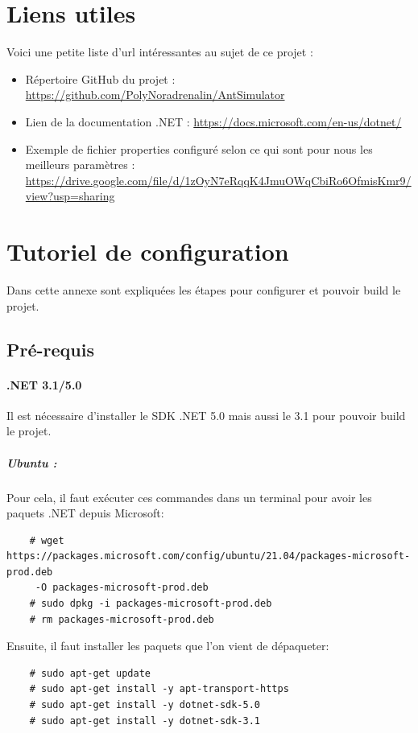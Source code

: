 \documentclass{EPUProjetDi}
\begin{document}
\chapter{Liens utiles}
Voici une petite liste d'url intéressantes au sujet de ce projet :

\begin{itemize}
\item {Répertoire GitHub du projet : \url{https://github.com/PolyNoradrenalin/AntSimulator} }
\item {Lien de la documentation .NET : \url{https://docs.microsoft.com/en-us/dotnet/}}
\item {Exemple de fichier properties configuré selon ce qui sont pour nous les meilleurs paramètres : 
\url {https://drive.google.com/file/d/1zOyN7eRqqK4JmuOWqCbiRo6OfmisKmr9/view?usp=sharing}}
\end{itemize}

\chapter{Tutoriel de configuration}
Dans cette annexe sont expliquées les étapes pour configurer et pouvoir build le projet.

\section*{Pré-requis}
\subsubsection*{.NET 3.1/5.0}
Il est nécessaire d'installer le SDK .NET 5.0 mais aussi le 3.1 pour pouvoir build le projet.

\paragraph{Ubuntu :}

\small
Pour cela, il faut exécuter ces commandes dans un terminal pour avoir les paquets .NET depuis Microsoft:
\begin{verbatim}
    # wget https://packages.microsoft.com/config/ubuntu/21.04/packages-microsoft-prod.deb 
     -O packages-microsoft-prod.deb
    # sudo dpkg -i packages-microsoft-prod.deb
    # rm packages-microsoft-prod.deb
\end{verbatim}
\normalsize

Ensuite, il faut installer les paquets que l'on vient de dépaqueter:

\begin{verbatim}
    # sudo apt-get update
    # sudo apt-get install -y apt-transport-https
    # sudo apt-get install -y dotnet-sdk-5.0
    # sudo apt-get install -y dotnet-sdk-3.1
\end{verbatim}
\end{document}
